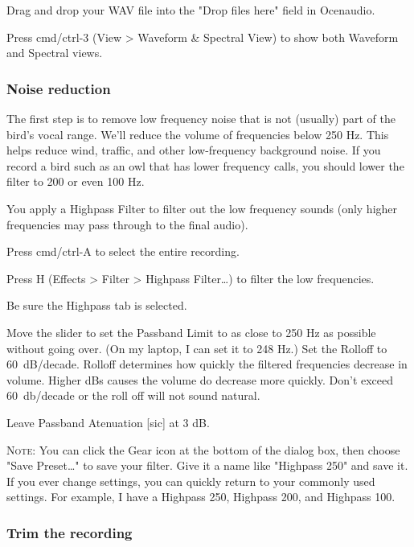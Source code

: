\documentclass[12pt]{article}
\begin{document}
Drag and drop your WAV file into the "Drop files here" field in Ocenaudio.

Press cmd/ctrl-3 (View > Waveform \& Spectral View) to show both Waveform and Spectral views.


\subsubsection*{Noise reduction}

The first step is to remove low frequency noise that is not (usually) part of the bird's vocal range. We'll reduce the volume of frequencies below 250 Hz. This helps reduce wind, traffic, and other low-frequency background noise. If you record a bird such as an owl that has lower frequency calls, you should lower the filter to 200 or even 100 Hz.

You apply a Highpass Filter to filter out the low frequency sounds (only higher frequencies may pass through to the final audio).

Press cmd/ctrl-A to select the entire recording.

Press H (Effects > Filter > Highpass Filter\ldots) to filter the low frequencies.

Be sure the Highpass tab is selected.

Move the slider to set the Passband Limit to as close to 250 Hz as possible without going over. (On my laptop, I can set it to 248 Hz.) Set the Rolloff to 60~dB/decade. Rolloff determines how quickly the filtered frequencies decrease in volume. Higher dBs causes the volume do decrease more quickly. Don't exceed 60~db/decade or the roll off will not sound natural.


Leave Passband Atenuation [sic] at 3 dB. 

\textsc{Note:} You can click the Gear icon at the bottom of the dialog box, then choose "Save Preset\ldots" to save your filter. Give it a name like "Highpass 250" and save it. If you ever change settings, you can quickly return to your commonly used settings. For example, I have a Highpass 250, Highpass 200, and Highpass 100.


\subsubsection*{Trim the recording}
\end{document}
